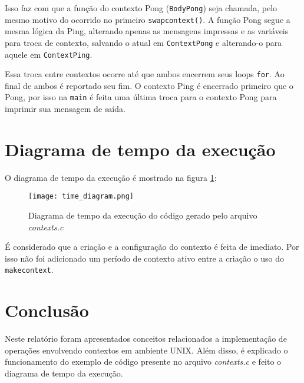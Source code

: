 \documentclass [12pt,oneside] {article}
\begin{document}
Isso faz com que a função do contexto Pong (\texttt{BodyPong}) seja chamada, pelo mesmo motivo do ocorrido no primeiro \texttt{swapcontext()}. A função Pong segue a mesma lógica da Ping, alterando apenas as mensagens impressas e as variáveis para troca de contexto, salvando o atual em \texttt{ContextPong} e alterando-o para aquele em \texttt{ContextPing}.

Essa troca entre contextos ocorre até que ambos encerrem seus loops \texttt{for}. Ao final de ambos é reportado seu fim. O contexto Ping é encerrado primeiro que o Pong, por isso na \texttt{main} é feita uma última troca para o contexto Pong para imprimir sua mensagem de saída.

\section{Diagrama de tempo da execução}

O diagrama de tempo da execução é mostrado na figura \ref{fig:tim_digr}:

\begin{figure}[H]
	\centering
	\texttt{[image: time\_diagram.png]}
	\caption{Diagrama de tempo da execução do código gerado pelo arquivo \emph{contexts.c}}
	\label{fig:tim_digr}
\end{figure}

É considerado que a criação e a configuração do contexto é feita de imediato. Por isso não foi adicionado um período de contexto ativo entre a criação o uso do \texttt{makecontext}.

\section{Conclusão}

Neste relatório foram apresentados conceitos relacionados a implementação de operações envolvendo contextos em ambiente UNIX. Além disso,  é explicado o funcionamento do exemplo de código presente no arquivo \emph{contexts.c} e feito o diagrama de tempo da execução.


\end{document}
